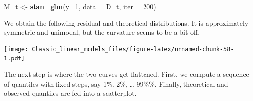 \documentclass[]{svmono}
\newenvironment{Shaded}{\begin{snugshade}}{\end{snugshade}}
\newcommand{\KeywordTok}[1]{\textcolor[rgb]{0.13,0.29,0.53}{\textbf{#1}}}
\newcommand{\DataTypeTok}[1]{\textcolor[rgb]{0.13,0.29,0.53}{#1}}
\newcommand{\DecValTok}[1]{\textcolor[rgb]{0.00,0.00,0.81}{#1}}
\newcommand{\StringTok}[1]{\textcolor[rgb]{0.31,0.60,0.02}{#1}}
\newcommand{\OperatorTok}[1]{\textcolor[rgb]{0.81,0.36,0.00}{\textbf{#1}}}
\newcommand{\NormalTok}[1]{#1}
\theoremstyle{definition}
\theoremstyle{definition}
\theoremstyle{definition}
\theoremstyle{remark}
\begin{document}
\begin{Shaded}
\begin{Highlighting}[]
\NormalTok{M_t <-}\StringTok{ }\KeywordTok{stan_glm}\NormalTok{(y }\OperatorTok{~}\DecValTok{1}\NormalTok{, }\DataTypeTok{data =}\NormalTok{ D_t, }\DataTypeTok{iter =} \DecValTok{200}\NormalTok{)}
\end{Highlighting}
\end{Shaded}

We obtain the following residual and theoretical distributions. It is
approximately symmetric and unimodal, but the curvature seems to be a
bit off.

\begin{Shaded}
\end{Shaded}

\texttt{[image: Classic\_linear\_models\_files/figure-latex/unnamed-chunk-58-1.pdf]}

The next step is where the two curves get flattened. First, we compute a
sequence of quantiles with fixed steps, say 1\%, 2\%, \ldots{} 99\%\%.
Finally, theoretical and observed quantiles are fed into a scatterplot.
\end{document}
